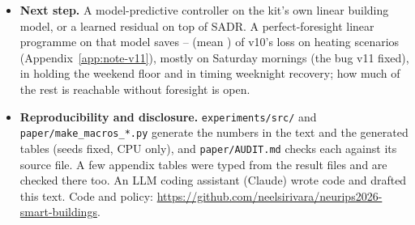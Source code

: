 \documentclass{article}
\begin{document}
\begin{itemize}
\item \textbf{Next step.} A model-predictive controller on the kit's own linear building model, or a learned residual on top of SADR. A perfect-foresight linear programme on that model saves \RElvLpMin--\RElvLpMax{} (mean \RElvLpMean) of v10's loss on \RElvLpN{} heating scenarios (Appendix~\ref{app:note-v11}), mostly on Saturday mornings (the bug v11 fixed), in holding the weekend floor and in timing weeknight recovery; how much of the rest is reachable without foresight is open.
\item \textbf{Reproducibility and disclosure.} \texttt{experiments/src/} and \texttt{paper/make\_macros\_*.py} generate the numbers in the text and the generated tables (seeds fixed, CPU only), and \texttt{paper/AUDIT.md} checks each against its source file. A few appendix tables were typed from the result files and are checked there too. An LLM coding assistant (Claude) wrote code and drafted this text. Code and policy: \url{https://github.com/neelsirivara/neurips2026-smart-buildings}.
\end{itemize}



\clearpage
\appendix
\end{document}

